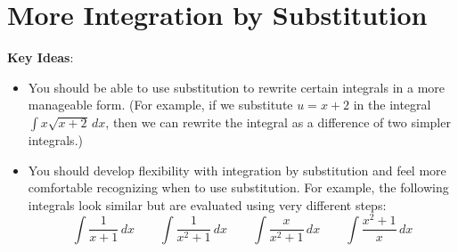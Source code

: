 \documentclass[main]{subfiles}
\begin{document}
\ifSubfilesClassLoaded{%
  \chaptermark{\chaptersix}
}{}

\section{More Integration by Substitution} \label{ws6-2}

\begin{problemonly}
    \begin{framed}

\textbf{Key Ideas}:

\begin{itemize}[topsep=0pt,partopsep=0pt,parsep=8pt,itemsep=0pt]

\item You should be able to use substitution to rewrite certain
  integrals in a more manageable form.  (For example, if we substitute
  $u = x + 2$ in the integral $\displaystyle \int x \sqrt{x + 2}\,dx$,
  then we can rewrite the integral as a difference of two simpler
  integrals.)

\item You should develop flexibility with integration by substitution
  and feel more comfortable recognizing when to use substitution.  For
  example, the following integrals look similar but are evaluated using
  very different steps:
  \[ \int \frac{1}{x+1} \, dx \qquad \int \frac{1}{x^2+1} \, dx \qquad
  \int \frac{x}{x^2+1} \, dx \qquad \int \frac{x^2 +1}{x} \, dx\]

\end{itemize}
\end{framed}
\end{problemonly}
\end{document}
